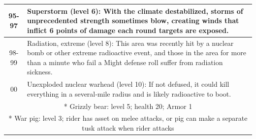 \begin{longtable}{| c | p{15cm} |}
95-97 &
Superstorm (level 6): With the climate
destabilized, storms of unprecedented strength
sometimes blow, creating winds that inflict 6 points
of damage each round targets are exposed. \\ \hline
98-99 &
Radiation, extreme (level 8): This area was
recently hit by a nuclear bomb or other extreme
radioactive event, and those in the area for more
than a minute who fail a Might defense roll suffer
from radiation sickness. \\ \hline
00 &
Unexploded nuclear warhead (level 10): If not
defused, it could kill everything in a several‑mile
radius and is likely radioactive to boot. \\ \hline

\multicolumn{2}{|p{15cm}|}{* Grizzly bear: level 5; health 20; Armor 1} \\ \hline
\multicolumn{2}{|p{15cm}|}{* War pig: level 3; rider has asset on melee attacks, or pig can make a separate tusk attack when rider attacks} \\ \hline
    
\end{longtable}

